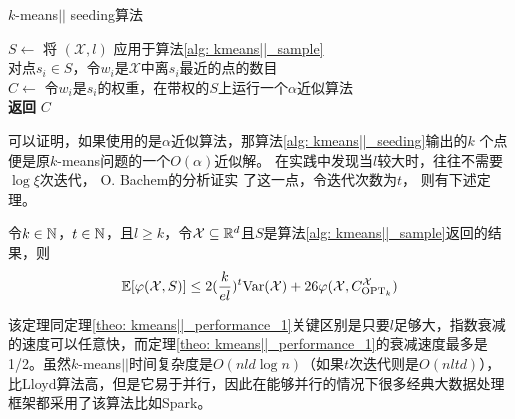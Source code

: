 \begin{algorithm}
    \caption{$k$-means\(\vert \vert\) seeding算法}\label{alg: kmeans||_seeding}
    $S \gets$ 将 $(\mathcal{X},l)$ 应用于算法\ref{alg: kmeans||_sample} \\
    对点$s_i \in S$，令$w_i$是$\mathcal{X}$中离$s_i$最近的点的数目 \\
    $C \gets$ 令$w_i$是$s_i$的权重，在带权的$S$上运行一个$\alpha$近似算法 \\
    \textbf{返回} $C$
\end{algorithm}
可以证明，如果使用的是$\alpha$近似算法，那算法\ref{alg: kmeans||_seeding}输出的$k$
个点便是原$k$-means问题的一个$O(\alpha)$近似解。 在实践中发现当$l$较大时，往往不需要$\log \xi$次迭代， O. Bachem\cite{bachem2017distributed}的分析证实
了这一点，令迭代次数为$t$， 则有下述定理。
\begin{theorem}
    令$k \in \mathbb{N}$，$t \in \mathbb{N}$，且$l \geq k$，令$\mathcal{X} \subseteq \mathbb{R}^d$且$S$是算法\ref{alg: kmeans||_sample}返回的结果，则
    \begin{equation*}
    \mathbb{E}[\varphi(\mathcal{X},S)] \leq 2(\frac{k}{el})^t \text{Var}(\mathcal{X}) + 26\varphi(\mathcal{X},C_{\text{OPT}_k}^{\mathcal{X}})
    \end{equation*}
\end{theorem}
该定理同定理\ref{theo: kmeans||_performance_1}关键区别是只要$l$足够大，指数衰减的速度可以任意快，而定理\ref{theo: kmeans||_performance_1}的衰减速度最多是1/2。虽然$k$-means\(\vert \vert\)时间复杂度是$O(nld \log n)$（如果$t$次迭代则是$O(nltd)$），比Lloyd算法高，但是它易于并行，因此在能够并行的情况下很多经典大数据处理框架都采用了该算法比如Spark。

